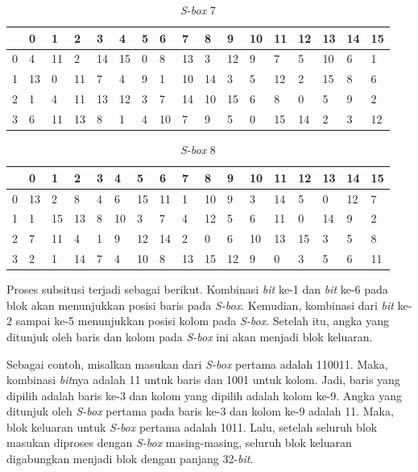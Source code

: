 \begin{table}[H]
	\caption{\textit{S-box} 7}\label{table:s_box7}
	\begin{center}
		\begin{tabular}{|l|l|l|l|l|l|l|l|l|l|l|l|l|l|l|l|l|}
				\hline
					& 0 & 1	& 2 & 3 & 4 & 5 & 6 & 7 & 8 & 9 & 10 & 11 & 12 & 13 & 14 & 15	\\ \hline
				0	&	4	&	11	&	2	&	14	&	15	&	0	&	8	&	13	&	3	&	12	&	9	&	7	&	5	&	10	&	6	&	1	\\ \hline
				1	&	13	&	0	&	11	&	7	&	4	&	9	&	1	&	10	&	14	&	3	&	5	&	12	&	2	&	15	&	8	&	6	\\ \hline
				2	&	1	&	4	&	11	&	13	&	12	&	3	&	7	&	14	&	10	&	15	&	6	&	8	&	0	&	5	&	9	&	2	\\ \hline
				3	&	6	&	11	&	13	&	8	&	1	&	4	&	10	&	7	&	9	&	5	&	0	&	15	&	14	&	2	&	3	&	12	\\ \hline
		\end{tabular}
	\end{center}
\end{table}

\begin{table}[H]
	\caption{\textit{S-box} 8}\label{table:s_box8}
	\begin{center}
		\begin{tabular}{|l|l|l|l|l|l|l|l|l|l|l|l|l|l|l|l|l|}
				\hline
				& 0 & 1	& 2 & 3 & 4 & 5 & 6 & 7 & 8 & 9 & 10 & 11 & 12 & 13 & 14 & 15	\\ \hline
			0	&	13	&	2	&	8	&	4	&	6	&	15	&	11	&	1	&	10	&	9	&	3	&	14	&	5	&	0	&	12	&	7	\\ \hline
			1	&	1	&	15	&	13	&	8	&	10	&	3	&	7	&	4	&	12	&	5	&	6	&	11	&	0	&	14	&	9	&	2	\\ \hline
			2	&	7	&	11	&	4	&	1	&	9	&	12	&	14	&	2	&	0	&	6	&	10	&	13	&	15	&	3	&	5	&	8	\\ \hline
			3	&	2	&	1	&	14	&	7	&	4	&	10	&	8	&	13	&	15	&	12	&	9	&	0	&	3	&	5	&	6	&	11	\\ \hline
		\end{tabular}
	\end{center}
\end{table}

Proses subsitusi terjadi sebagai berikut. Kombinasi \textit{bit} ke-1 dan \textit{bit} ke-6 pada blok akan menunjukkan posisi baris pada \textit{S-box}. Kemudian, kombinasi dari \textit{bit} ke-2 sampai ke-5 menunjukkan posisi kolom pada \textit{S-box}. Setelah itu, angka yang ditunjuk oleh baris dan kolom pada \textit{S-box} ini akan menjadi blok keluaran.

Sebagai contoh, misalkan masukan dari \textit{S-box} pertama adalah 110011. Maka, kombinasi \textit{bit}nya adalah 11 untuk baris dan 1001 untuk kolom. Jadi, baris yang dipilih adalah baris ke-3 dan kolom yang dipilih adalah kolom ke-9. Angka yang ditunjuk oleh \textit{S-box} pertama pada baris ke-3 dan kolom ke-9 adalah 11. Maka, blok keluaran untuk \textit{S-box} pertama adalah 1011. Lalu, setelah seluruh blok masukan diproses dengan \textit{S-box} masing-masing, seluruh blok keluaran digabungkan menjadi blok dengan panjang 32-\textit{bit}.

